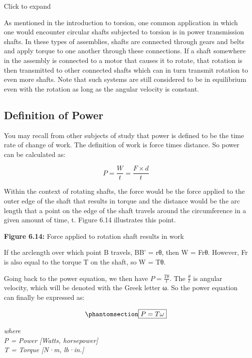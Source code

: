 \documentclass[
  letterpaper,
  DIV=11,
  numbers=noendperiod]{scrreprt}
\theoremstyle{definition}
\theoremstyle{remark}
\begin{document}
Click to expand

As mentioned in the introduction to torsion, one common application in
which one would encounter circular shafts subjected to torsion is in
power transmission shafts. In these types of assemblies, shafts are
connected through gears and belts and apply torque to one another
through these connections. If a shaft somewhere in the assembly is
connected to a motor that causes it to rotate, that rotation is then
transmitted to other connected shafts which can in turn transmit
rotation to even more shafts. Note that such systems are still
considered to be in equilibrium even with the rotation as long as the
angular velocity is constant.

\subsection{Definition of Power}\label{definition-of-power}

You may recall from other subjects of study that power is defined to be
the time rate of change of work. The definition of work is force times
distance. So power can be calculated as:

\[
P=\frac{W}{t}=\frac{F \times d}{t}
\]

Within the context of rotating shafts, the force would be the force
applied to the outer edge of the shaft that results in torque and the
distance would be the arc length that a point on the edge of the shaft
travels around the circumference in a given amount of time, t. Figure
6.14 illustrates this point.

\textbf{Figure 6.14:} Force applied to rotation shaft results in work

If the arclength over which point B travels, BB' = rθ, then W = Frθ.
However, Fr is also equal to the torque T on the shaft, so W = Tθ.

Going back to the power equation, we then have \(P=\frac{T \theta}{t}\).
The \(\frac{\theta}{t}\) is angular velocity, which will be denoted with
the Greek letter ω. So the power equation can finally be expressed as:

\begin{equation}\phantomsection\label{eq-6.4}{
\boxed{P = T\omega}
}\end{equation}

\emph{where}\\
\emph{P = Power {[}Watts, horsepower{]}}\\
\emph{T = Torque {[}N·m, lb·in.{]}}
\end{document}
